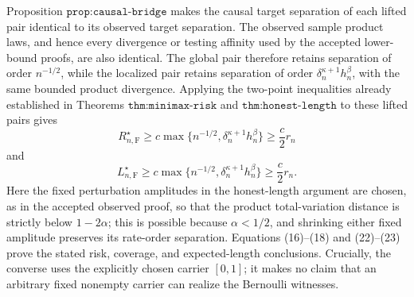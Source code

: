Proposition \(\texttt{prop:causal-bridge}\) makes the causal target separation of each lifted pair identical to its observed target separation.  The observed sample product laws, and hence every divergence or testing affinity used by the accepted lower-bound proofs, are also identical.  The global pair therefore retains separation of order \(n^{-1/2}\), while the localized pair retains separation of order \(\delta_n^{\kappa+1}h_n^\beta\), with the same bounded product divergence.  Applying the two-point inequalities already established in Theorems \(\texttt{thm:minimax-risk}\) and \(\texttt{thm:honest-length}\) to these lifted pairs gives
\[
 R_{n,\mathrm F}^\star
 \geq c\max\{n^{-1/2},\delta_n^{\kappa+1}h_n^\beta\}
 \geq \frac c2 r_n
 \tag{22}
\]
and
\[
 L_{n,\mathrm F}^\star
 \geq c\max\{n^{-1/2},\delta_n^{\kappa+1}h_n^\beta\}
 \geq \frac c2 r_n.
 \tag{23}
\]
Here the fixed perturbation amplitudes in the honest-length argument are chosen, as in the accepted observed proof, so that the product total-variation distance is strictly below \(1-2\alpha\); this is possible because \(\alpha<1/2\), and shrinking either fixed amplitude preserves its rate-order separation.  Equations (16)--(18) and (22)--(23) prove the stated risk, coverage, and expected-length conclusions.  Crucially, the converse uses the explicitly chosen carrier \([0,1]\); it makes no claim that an arbitrary fixed nonempty carrier can realize the Bernoulli witnesses.